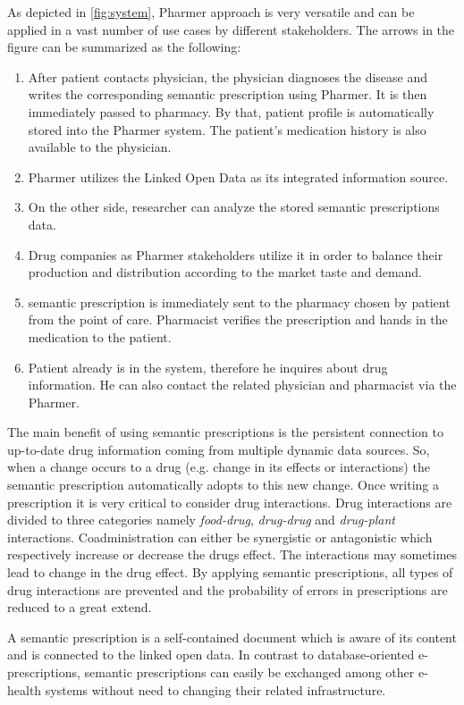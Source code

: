 \documentclass[10pt, conference, compsocconf]{IEEEtran}
\begin{document}
As depicted in \autoref{fig:system}, Pharmer approach is very versatile and can be applied in a vast number of use cases by different stakeholders. The arrows in the figure can be summarized as the following:
\begin{enumerate}
\item After patient contacts physician, the physician diagnoses the disease and writes the corresponding semantic prescription using Pharmer. It is then immediately passed to pharmacy. By that, patient profile is automatically stored into the Pharmer system. The patient's medication history is also available to the physician.
\item Pharmer utilizes the Linked Open Data as its integrated information source.
\item On the other side, researcher can analyze the stored semantic prescriptions data.
\item Drug companies as Pharmer stakeholders utilize it in order to balance their production and distribution according to the market taste and demand.
\item semantic prescription is immediately sent to the pharmacy chosen by patient from the point of care. Pharmacist verifies the prescription and hands in the medication to the patient.
\item Patient already is in the system, therefore he inquires about drug information. He can also contact the related physician and pharmacist via the Pharmer.
\end{enumerate}

The main benefit of using semantic prescriptions is the persistent connection to up-to-date drug information coming from multiple dynamic data sources.
So, when a change occurs to a drug (e.g. change in its effects or interactions) the semantic prescription automatically adopts to this new change.
Once writing a prescription it is very critical to consider drug interactions.
Drug interactions are divided to three categories namely \emph{food-drug}, \emph{drug-drug} and \emph{drug-plant} interactions.
Coadministration can either be synergistic or antagonistic which respectively increase or decrease the drugs effect.
The interactions may sometimes lead to change in the drug effect.
By applying semantic prescriptions, all types of drug interactions are prevented and the probability of errors in prescriptions are reduced to a great extend.

A semantic prescription is a self-contained document which is aware of its content and is connected to the linked open data.
In contrast to database-oriented e-prescriptions, semantic prescriptions can easily be exchanged among other e-health systems without need to changing their related infrastructure.
\end{document}

